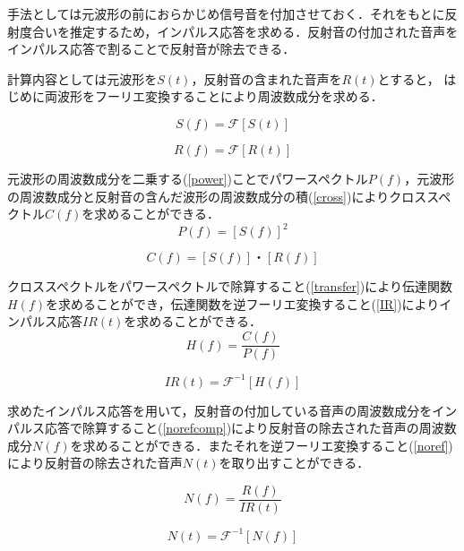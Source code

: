 \documentclass[a4j,11pt]{jsarticle}
\begin{document}
手法としては元波形の前におらかじめ信号音を付加させておく．それをもとに反射度合いを推定するため，インパルス応答を求める．反射音の付加された音声をインパルス応答で割ることで反射音が除去できる．

計算内容としては元波形を$S(t)$，反射音の含まれた音声を$R(t)$とすると，
はじめに両波形をフーリエ変換することにより周波数成分を求める．

\begin{equation}
  S(f) = \mathcal{F}[S(t)]
\end{equation}

\begin{equation}
  R(f) = \mathcal{F}[R(t)]
\end{equation}
 
元波形の周波数成分を二乗する(\ref{power})ことでパワースペクトル$P(f)$，元波形の周波数成分と反射音の含んだ波形の周波数成分の積(\ref{cross})によりクロススペクトル$C(f)$を求めることができる．
\begin{equation}
	\label{power}
  P(f) = [S(f)]^2
\end{equation}

\begin{equation}
	\label{cross}
  C(f) = [S(f)]・[R(f)]
\end{equation}

クロススペクトルをパワースペクトルで除算すること(\ref{transfer})により伝達関数$H(f)$を求めることができ，伝達関数を逆フーリエ変換すること(\ref{IR})によりインパルス応答$IR(t)$を求めることができる．
\begin{equation}
	\label{transfer}
  H(f) = \frac{C(f)}{P(f)}
\end{equation}

\begin{equation}
	\label{IR}
  IR(t) = \mathcal{F}^{-1}[H(f)]
\end{equation}

求めたインパルス応答を用いて，反射音の付加している音声の周波数成分をインパルス応答で除算すること(\ref{norefcomp})により反射音の除去された音声の周波数成分$N(f)$を求めることができる．またそれを逆フーリエ変換すること(\ref{noref})により反射音の除去された音声$N(t)$を取り出すことができる．

\begin{equation}
	\label{norefcomp}
  N(f) = \frac{R(f)}{IR(t)}
\end{equation}

\begin{equation}
	\label{noref}
  N(t) = \mathcal{F}^{-1}[N(f)]
\end{equation}
\end{document}
